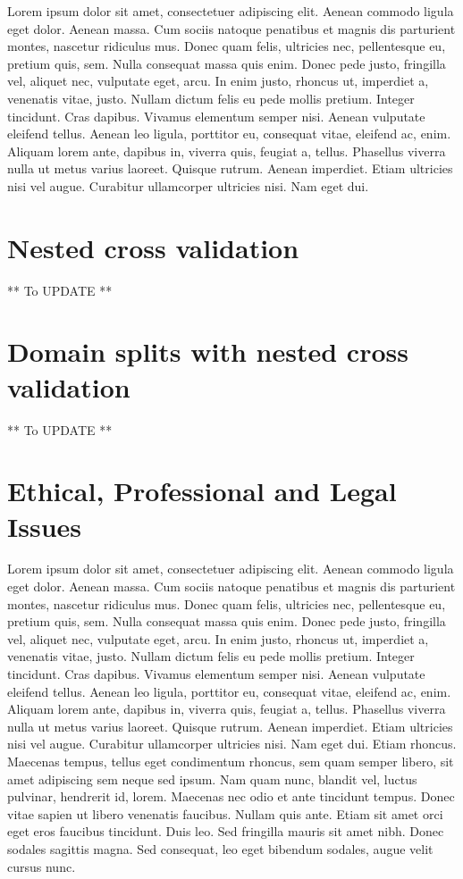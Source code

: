 Lorem ipsum dolor sit amet, consectetuer adipiscing elit. Aenean commodo ligula eget dolor. Aenean massa. Cum sociis natoque penatibus et magnis dis parturient montes, nascetur ridiculus mus. Donec quam felis, ultricies nec, pellentesque eu, pretium quis, sem. Nulla consequat massa quis enim. Donec pede justo, fringilla vel, aliquet nec, vulputate eget, arcu. In enim justo, rhoncus ut, imperdiet a, venenatis vitae, justo. Nullam dictum felis eu pede mollis pretium. Integer tincidunt. Cras dapibus. Vivamus elementum semper nisi. Aenean vulputate eleifend tellus. Aenean leo ligula, porttitor eu, consequat vitae, eleifend ac, enim. Aliquam lorem ante, dapibus in, viverra quis, feugiat a, tellus. Phasellus viverra nulla ut metus varius laoreet. Quisque rutrum. Aenean imperdiet. Etiam ultricies nisi vel augue. Curabitur ullamcorper ultricies nisi. Nam eget dui. 

\section{Nested cross validation}
** To UPDATE **

\section{Domain splits with nested cross validation}
** To UPDATE **

\section{Ethical, Professional and Legal Issues}

Lorem ipsum dolor sit amet, consectetuer adipiscing elit. Aenean commodo ligula eget dolor. Aenean massa. Cum sociis natoque penatibus et magnis dis parturient montes, nascetur ridiculus mus. Donec quam felis, ultricies nec, pellentesque eu, pretium quis, sem. Nulla consequat massa quis enim. Donec pede justo, fringilla vel, aliquet nec, vulputate eget, arcu. In enim justo, rhoncus ut, imperdiet a, venenatis vitae, justo. Nullam dictum felis eu pede mollis pretium. Integer tincidunt. Cras dapibus. Vivamus elementum semper nisi. Aenean vulputate eleifend tellus. Aenean leo ligula, porttitor eu, consequat vitae, eleifend ac, enim. Aliquam lorem ante, dapibus in, viverra quis, feugiat a, tellus. Phasellus viverra nulla ut metus varius laoreet. Quisque rutrum. Aenean imperdiet. Etiam ultricies nisi vel augue. Curabitur ullamcorper ultricies nisi. Nam eget dui. Etiam rhoncus. Maecenas tempus, tellus eget condimentum rhoncus, sem quam semper libero, sit amet adipiscing sem neque sed ipsum. Nam quam nunc, blandit vel, luctus pulvinar, hendrerit id, lorem. Maecenas nec odio et ante tincidunt tempus. Donec vitae sapien ut libero venenatis faucibus. Nullam quis ante. Etiam sit amet orci eget eros faucibus tincidunt. Duis leo. Sed fringilla mauris sit amet nibh. Donec sodales sagittis magna. Sed consequat, leo eget bibendum sodales, augue velit cursus nunc.
